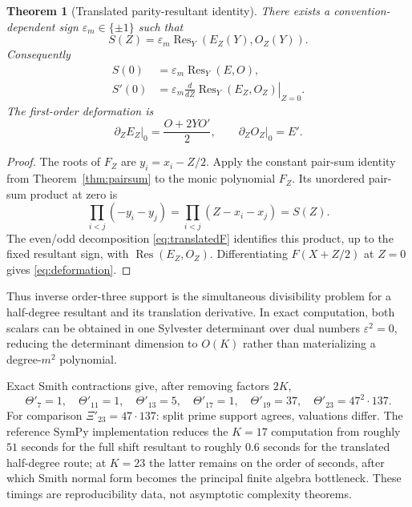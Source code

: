 \documentclass[11pt]{article}
\newtheorem{theorem}{Theorem}[section]
\newcommand{\Res}{\operatorname{Res}}
\begin{document}
\begin{theorem}[Translated parity-resultant identity]\label{thm:translated-res}
There exists a convention-dependent sign $\varepsilon_m\in\{\pm1\}$ such that
\begin{equation}\label{eq:translated-res}
S(Z)=\varepsilon_m\Res_Y(E_Z(Y),O_Z(Y)).
\end{equation}
Consequently
\begin{align}
S(0)&=\varepsilon_m\Res_Y(E,O),\label{eq:s0res}\\
S'(0)&=\varepsilon_m
\left.\frac{d}{dZ}\Res_Y(E_Z,O_Z)\right|_{Z=0}.\label{eq:s1res}
\end{align}
The first-order deformation is
\begin{equation}\label{eq:deformation}
\left.\partial_ZE_Z\right|_0=\frac{O+2YO'}{2},
\qquad
\left.\partial_ZO_Z\right|_0=E'.
\end{equation}
\end{theorem}

\begin{proof}
The roots of $F_Z$ are $y_i=x_i-Z/2$.  Apply the constant pair-sum identity
from Theorem~\ref{thm:pairsum} to the monic polynomial $F_Z$.  Its unordered
pair-sum product at zero is
\[
\prod_{i<j}(-y_i-y_j)
 =\prod_{i<j}(Z-x_i-x_j)=S(Z).
\]
The even/odd decomposition \eqref{eq:translatedF} identifies this product,
up to the fixed resultant sign, with $\Res(E_Z,O_Z)$.  Differentiating
$F(X+Z/2)$ at $Z=0$ gives \eqref{eq:deformation}.
\end{proof}

Thus inverse order-three support is the simultaneous divisibility problem for a
half-degree resultant and its translation derivative.  In exact computation,
both scalars can be obtained in one Sylvester determinant over dual numbers
$\varepsilon^2=0$, reducing the determinant dimension to $O(K)$ rather than
materializing a degree-$m^2$ polynomial.

Exact Smith contractions give, after removing factors $2K$,
\[
\Theta'_7=1,\quad
\Theta'_{11}=1,\quad
\Theta'_{13}=5,\quad
\Theta'_{17}=1,\quad
\Theta'_{19}=37,\quad
\Theta'_{23}=47^2\cdot137.
\]
For comparison $\Xi'_{23}=47\cdot137$: split prime support agrees, valuations
differ.  The reference SymPy implementation reduces the $K=17$ computation
from roughly $51$ seconds for the full shift resultant to roughly $0.6$ seconds
for the translated half-degree route; at $K=23$ the latter remains on the
order of seconds, after which Smith normal form becomes the principal finite
algebra bottleneck.  These timings are reproducibility data, not asymptotic
complexity theorems.
\end{document}

